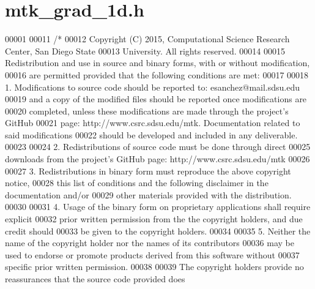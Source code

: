 \hypertarget{mtk__grad__1d_8h_source}{\section{mtk\+\_\+grad\+\_\+1d.\+h}
\label{mtk__grad__1d_8h_source}
}

\begin{DoxyCode}
00001 
00011 \textcolor{comment}{/*}
00012 \textcolor{comment}{Copyright (C) 2015, Computational Science Research Center, San Diego State}
00013 \textcolor{comment}{University. All rights reserved.}
00014 \textcolor{comment}{}
00015 \textcolor{comment}{Redistribution and use in source and binary forms, with or without modification,}
00016 \textcolor{comment}{are permitted provided that the following conditions are met:}
00017 \textcolor{comment}{}
00018 \textcolor{comment}{1. Modifications to source code should be reported to: esanchez@mail.sdsu.edu}
00019 \textcolor{comment}{and a copy of the modified files should be reported once modifications are}
00020 \textcolor{comment}{completed, unless these modifications are made through the project's GitHub}
00021 \textcolor{comment}{page: http://www.csrc.sdsu.edu/mtk. Documentation related to said modifications}
00022 \textcolor{comment}{should be developed and included in any deliverable.}
00023 \textcolor{comment}{}
00024 \textcolor{comment}{2. Redistributions of source code must be done through direct}
00025 \textcolor{comment}{downloads from the project's GitHub page: http://www.csrc.sdsu.edu/mtk}
00026 \textcolor{comment}{}
00027 \textcolor{comment}{3. Redistributions in binary form must reproduce the above copyright notice,}
00028 \textcolor{comment}{this list of conditions and the following disclaimer in the documentation and/or}
00029 \textcolor{comment}{other materials provided with the distribution.}
00030 \textcolor{comment}{}
00031 \textcolor{comment}{4. Usage of the binary form on proprietary applications shall require explicit}
00032 \textcolor{comment}{prior written permission from the the copyright holders, and due credit should}
00033 \textcolor{comment}{be given to the copyright holders.}
00034 \textcolor{comment}{}
00035 \textcolor{comment}{5. Neither the name of the copyright holder nor the names of its contributors}
00036 \textcolor{comment}{may be used to endorse or promote products derived from this software without}
00037 \textcolor{comment}{specific prior written permission.}
00038 \textcolor{comment}{}
00039 \textcolor{comment}{The copyright holders provide no reassurances that the source code provided does}

\end{DoxyCode}
